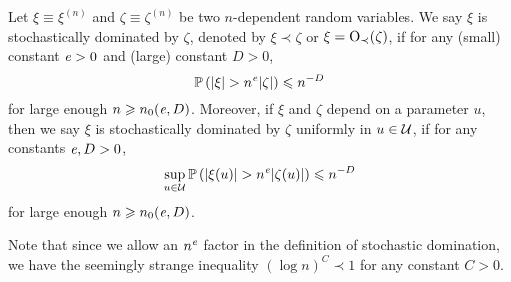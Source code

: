 \begin{definition}\label{stoch_domination}
Let $\xi\equiv \xi^{(n)}$ and $\zeta\equiv \zeta^{(n)}$ be two $n$-dependent random variables.  
We say $\xi$ is stochastically dominated by $\zeta$, denoted by $\xi\prec \zeta$ or $\xi=\OO_\prec(\zeta)$, if for any (small) constant $\e>0$ and (large) constant $D>0$, 
\[ \bbP\left(|\xi| >n^\e |\zeta|\right)\le n^{-D}\]
for large enough $n\ge n_0(\e, D)$. Moreover, if $\xi$ and $\zeta$ depend on a parameter $u$, then we say $\xi$ is stochastically dominated by $\zeta$ uniformly in $u\in \cal U$,  if for any constants $\e,D>0$, 
\[\sup_{u\in \cal U}\bbP\left(|\xi(u)|>n^\e |\zeta(u)|\right)\le n^{-D}\]
for large enough $n\ge n_0(\e, D)$.
\end{definition}
\begin{remark}
Note that since we allow an $n^\e$ factor in the definition of stochastic domination, we have the seemingly strange inequality $(\log n)^C\prec 1$ for any constant $C>0$. 
\end{remark}


